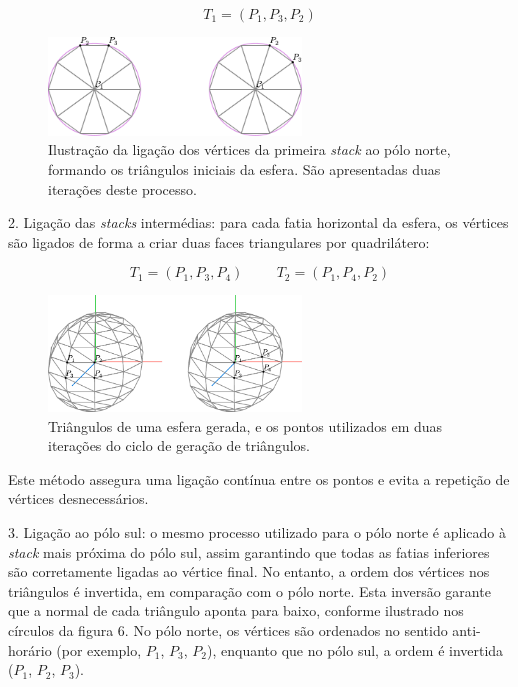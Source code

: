 \documentclass[12pt, a4paper]{article}
\begin{document}
$$
T_1 = (P_1, P_3, P_2)
$$

\begin{figure}[H]
    \centering
    \includegraphics[width=0.6\textwidth]{res/phase1/figures/polosSphere.pdf}
    \caption{
        \onehalfspacing
        Ilustração da ligação dos vértices da primeira \emph{stack} ao pólo norte, formando os
        triângulos iniciais da esfera. São apresentadas duas iterações deste processo.
    }
\end{figure}

2. Ligação das \emph{stacks} intermédias: para cada fatia horizontal da esfera, os vértices são
ligados de forma a criar duas faces triangulares por quadrilátero:

$$
T_1 = (P_1, P_3, P_4)
\hspace{1cm}
T_2 = (P_1, P_4, P_2)
$$

\begin{figure}[H]
    \centering
    \includegraphics[width=0.6\textwidth]{res/phase1/figures/sphere.pdf}
    \caption{
        \onehalfspacing
        Triângulos de uma esfera gerada, e os pontos utilizados em duas iterações do ciclo de
        geração de triângulos.
    }
\end{figure}

Este método assegura uma ligação contínua entre os pontos e evita a repetição de vértices
desnecessários.

3. Ligação ao pólo sul: o mesmo processo utilizado para o pólo norte é aplicado à \emph{stack} mais
próxima do pólo sul, assim garantindo que todas as fatias inferiores são corretamente ligadas ao
vértice final. No entanto, a ordem dos vértices nos triângulos é invertida, em comparação com o pólo
norte. Esta inversão garante que a normal de cada triângulo aponta para baixo, conforme ilustrado
nos círculos da figura 6. No pólo norte, os vértices são ordenados no sentido anti-horário (por
exemplo, $P_1$, $P_3$, $P_2$), enquanto que no pólo sul, a ordem é invertida ($P_1$, $P_2$, $P_3$).
\end{document}
